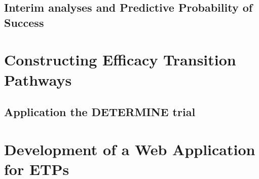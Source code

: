
\subsection{Interim analyses and Predictive Probability of Success}


\section{Constructing Efficacy Transition Pathways}


\subsection{Application the DETERMINE trial}


\section{Development of a Web Application for ETPs}